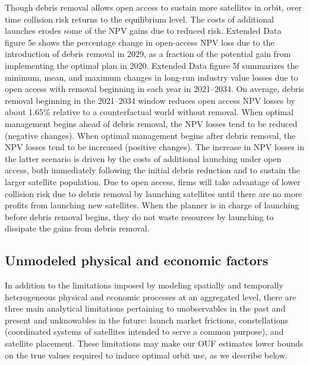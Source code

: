 \documentclass[9pt,twoside,lineno]{pnas-new}
\begin{document}
Though debris removal allows open access to sustain more satellites in orbit, over time collision risk returns to the equilibrium level. The costs of additional launches erodes some of the NPV gains due to reduced risk. Extended Data figure 5e shows the percentage change in open-access NPV loss due to the introduction of debris removal in 2029, as a fraction of the potential gain from implementing the optimal plan in 2020. Extended Data figure 5f summarizes the minimum, mean, and maximum changes in long-run industry value losses due to open access with removal beginning in each year in 2021--2034. On average, debris removal beginning in the 2021--2034 window reduces open access NPV losses by about 1.65\% relative to a counterfactual world without removal. When optimal management begins ahead of debris removal, the NPV losses tend to be reduced (negative changes). When optimal management begins after debris removal, the NPV losses tend to be increased (positive changes). The increase in NPV losses in the latter scenario is driven by the costs of additional launching under open access, both immediately following the initial debris reduction and to sustain the larger satellite population. Due to open access, firms will take advantage of lower collision risk due to debris removal by launching satellites until there are no more profits from launching new satellites. When the planner is in charge of launching before debris removal begins, they do not waste resources by launching to dissipate the gains from debris removal.

\subsection{Unmodeled physical and economic factors}
\label{disc_unmodeledeconphys}
In addition to the limitations imposed by modeling spatially and temporally heterogeneous physical and economic processes at an aggregated level, there are three main analytical limitations pertaining to unobservables in the past and present and unknowables in the future: launch market frictions, constellations (coordinated systems of satellites intended to serve a common purpose), and satellite placement. These limitations may make our OUF estimates lower bounds on the true values required to induce optimal orbit use, as we describe below.\\ 
\end{document}
